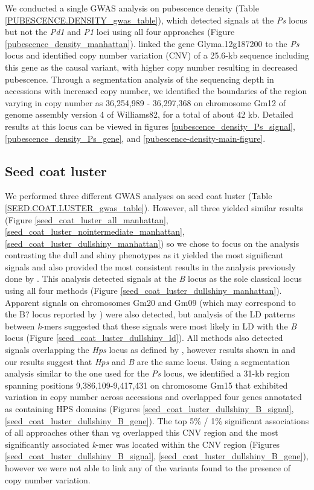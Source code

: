 \documentclass[12pt]{article}
\begin{document}
We conducted a single GWAS analysis on pubescence density (Table
\ref{PUBESCENCE.DENSITY_gwas_table}), which detected signals at the \emph{Ps}
locus but not the \emph{Pd1} and \emph{P1} loci using all four approaches
(Figure \ref{pubescence_density_manhattan}). \cite{liu2020ps} linked the gene
Glyma.12g187200 to the \emph{Ps} locus and identified copy number variation
(CNV) of a 25.6-kb sequence including this gene as the causal variant, with
higher copy number resulting in decreased pubescence. Through a segmentation
analysis of the sequencing depth in accessions with increased copy number, we
identified the boundaries of the region varying in copy number as 36,254,989 -
36,297,368 on chromosome Gm12 of genome assembly version 4 of Williams82, for a
total of about 42 kb. Detailed results at this locus can be viewed in figures
\ref{pubescence_density_Ps_signal}, \ref{pubescence_density_Ps_gene}, and
\ref{pubescence-density-main-figure}.

\subsection{Seed coat luster}
\label{sv-gwas-seed-coat-luster}

We performed three different GWAS analyses on seed coat luster (Table
\ref{SEED.COAT.LUSTER_gwas_table}).  However, all three yielded similar results
(Figure \ref{seed_coat_luster_all_manhattan},
\ref{seed_coat_luster_nointermediate_manhattan},
\ref{seed_coat_luster_dullshiny_manhattan}) so we chose to focus on the
analysis contrasting the dull and shiny phenotypes as it yielded the most
significant signals and also provided the most consistent results in the
analysis previously done by \cite{bandillo2017}. This analysis detected
signals at the \emph{B} locus as the sole classical locus using all four
methods (Figure \ref{seed_coat_luster_dullshiny_manhattan}). Apparent signals
on chromosomes Gm20 and Gm09 (which may correspond to the B? locus reported by
\cite{bandillo2017}) were also detected, but analysis of the LD patterns
between \emph{k}-mers suggested that these signals were most likely in LD with
the \emph{B} locus (Figure \ref{seed_coat_luster_dullshiny_ld}). All methods
also detected signals overlapping the \emph{Hps} locus as defined by
\cite{bandillo2017}, however results shown in \cite{gijzen2003} and our results
suggest that \emph{Hps} and \emph{B} are the same locus. Using a segmentation analysis
similar to the one used for the \emph{Ps} locus, we identified a 31-kb region
spanning positions 9,386,109-9,417,431 on chromosome Gm15 that exhibited
variation in copy number across accessions and overlapped four genes annotated
as containing HPS domains (Figures \ref{seed_coat_luster_dullshiny_B_signal},
\ref{seed_coat_luster_dullshiny_B_gene}). The top 5\% / 1\% significant
associations of all approaches other than vg overlapped this CNV region and the
most significantly associated \emph{k}-mer was located within the CNV region
(Figures \ref{seed_coat_luster_dullshiny_B_signal},
\ref{seed_coat_luster_dullshiny_B_gene}), however we were not able to link any
of the variants found to the presence of copy number variation.
\end{document}
